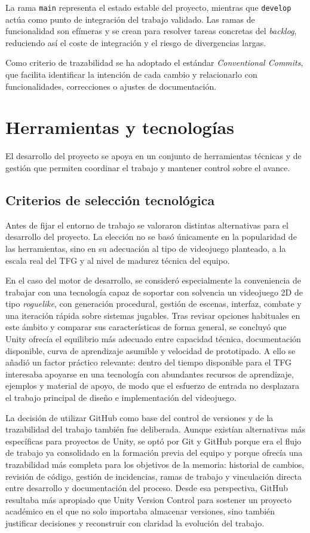 La rama \texttt{main} representa el estado estable del proyecto, mientras que
\texttt{develop} actúa como punto de integración del trabajo validado. Las ramas de
funcionalidad son efímeras y se crean para resolver tareas concretas del \textit{backlog},
reduciendo así el coste de integración y el riesgo de divergencias largas.

Como criterio de trazabilidad se ha adoptado el estándar \textit{Conventional Commits},
que facilita identificar la intención de cada cambio y relacionarlo con funcionalidades,
correcciones o ajustes de documentación.

\section{Herramientas y tecnologías}
El desarrollo del proyecto se apoya en un conjunto de herramientas técnicas y de gestión
que permiten coordinar el trabajo y mantener control sobre el avance.

\subsection{Criterios de selección tecnológica}
Antes de fijar el entorno de trabajo se valoraron distintas alternativas para el desarrollo
del proyecto. La elección no se basó únicamente en la popularidad de las herramientas, sino
en su adecuación al tipo de videojuego planteado, a la escala real del TFG y al nivel de
madurez técnica del equipo.

En el caso del motor de desarrollo, se consideró especialmente la conveniencia de trabajar
con una tecnología capaz de soportar con solvencia un videojuego 2D de tipo
\textit{roguelike}, con generación procedural, gestión de escenas, interfaz, combate y una
iteración rápida sobre sistemas jugables. Tras revisar opciones habituales en este ámbito y
comparar sus características de forma general, se concluyó que Unity ofrecía el equilibrio
más adecuado entre capacidad técnica, documentación disponible, curva de aprendizaje
asumible y velocidad de prototipado. A ello se añadió un factor práctico relevante: dentro
del tiempo disponible para el TFG interesaba apoyarse en una tecnología con abundantes
recursos de aprendizaje, ejemplos y material de apoyo, de modo que el esfuerzo de entrada no
desplazara el trabajo principal de diseño e implementación del videojuego.

La decisión de utilizar GitHub como base del control de versiones y de la trazabilidad del
trabajo también fue deliberada. Aunque existían alternativas más específicas para proyectos
de Unity, se optó por Git y GitHub porque era el flujo de trabajo ya consolidado en la
formación previa del equipo y porque ofrecía una trazabilidad más completa para los
objetivos de la memoria: historial de cambios, revisión de código, gestión de incidencias,
ramas de trabajo y vinculación directa entre desarrollo y documentación del proceso. Desde
esa perspectiva, GitHub resultaba más apropiado que Unity Version Control para sostener un
proyecto académico en el que no solo importaba almacenar versiones, sino también justificar
decisiones y reconstruir con claridad la evolución del trabajo.

